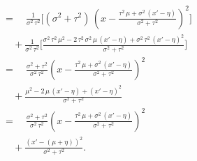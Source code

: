 \documentclass[
  letterpaper,
  DIV=11,
  numbers=noendperiod]{scrartcl}
\begin{document}
\begin{align*}
\\
&=\quad
\frac{1}{ \sigma^{2} \, \tau^{2} }
\bigg[
  ( \sigma^{2} + \tau^{2} ) \, \left(
    x -
    \frac{
      \tau^{2} \, \mu + \sigma^{2} \, (x' - \eta)
    }{
      \sigma^{2} + \tau^{2}
    }
  \right)^{2}
\bigg]
\\
&\quad+
\frac{1}{ \sigma^{2} \, \tau^{2} } \bigg[
    \frac{
       \sigma^{2} \, \tau^{2} \, \mu^{2}
     - 2 \, \tau^{2} \, \sigma^{2} \, \mu \, (x' - \eta)
     + \sigma^{2} \, \tau^{2} \, ( x' - \eta)^{2}
    }{
      \sigma^{2} + \tau^{2}
    }
\bigg]
\\
&=\quad
\frac{\sigma^{2} + \tau^{2} }{ \sigma^{2} \, \tau^{2} }
\left(
  x -
  \frac{
    \tau^{2} \, \mu + \sigma^{2} \, (x' - \eta)
  }{
    \sigma^{2} + \tau^{2}
  }
\right)^{2}
\\
&\quad+
\frac{
   \mu^{2}
 - 2 \, \mu \, (x' - \eta)
 + ( x' - \eta)^{2}
}{
  \sigma^{2} + \tau^{2}
}
\\
&=\quad
\frac{\sigma^{2} + \tau^{2} }{ \sigma^{2} \, \tau^{2} }
\left(
  x -
  \frac{
    \tau^{2} \, \mu + \sigma^{2} \, (x' - \eta)
  }{
    \sigma^{2} + \tau^{2}
  }
\right)^{2}
\\
&\quad+
\frac{
  ( x ' - (\mu + \eta) )^{2}
}{
  \sigma^{2} + \tau^{2}
}.
\end{align*}
\end{document}
